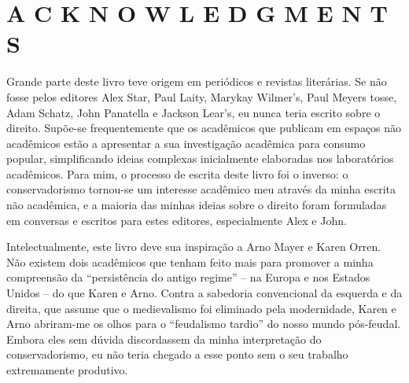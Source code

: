  
 \chapter{A C K N O W L E D G M E N T S}  

 \label{A C K N O W L E D G M E N T S}  
 
 
\par
 
 
 \textit{	}  

 
\par
 
 
 
\par
 

 \textbf{\textit{	} }  

 
\par
 
Grande parte deste livro teve origem em periódicos e revistas literárias. Se não fosse pelos editores Alex Star, Paul Laity, Marykay Wilmer's, Paul Meyers tosse, Adam Schatz, John Panatella e Jackson Lear's, eu nunca teria escrito sobre o direito. Supõe-se frequentemente que os acadêmicos que publicam em espaços não acadêmicos estão a apresentar a sua investigação acadêmica para consumo popular, simplificando ideias complexas inicialmente elaboradas nos laboratórios acadêmicos. Para mim, o processo de escrita deste livro foi o inverso: o conservadorismo tornou-se um interesse acadêmico meu através da minha escrita não acadêmica, e a maioria das minhas ideias sobre o direito foram formuladas em conversas e escritos para estes editores, especialmente Alex e John.
 
\par
 
Intelectualmente, este livro deve sua inspiração a Arno Mayer e Karen Orren. Não existem dois acadêmicos que tenham feito mais para promover a minha compreensão da “persistência do antigo regime” – na Europa e nos Estados Unidos – do que Karen e Arno. Contra a sabedoria convencional da esquerda e da direita, que assume que o medievalismo foi eliminado pela modernidade, Karen e Arno abriram-me os olhos para o “feudalismo tardio” do nosso mundo pós-feudal. Embora eles sem dúvida discordassem da minha interpretação do conservadorismo, eu não teria chegado a esse ponto sem o seu trabalho extremamente produtivo.
 
\par
 
